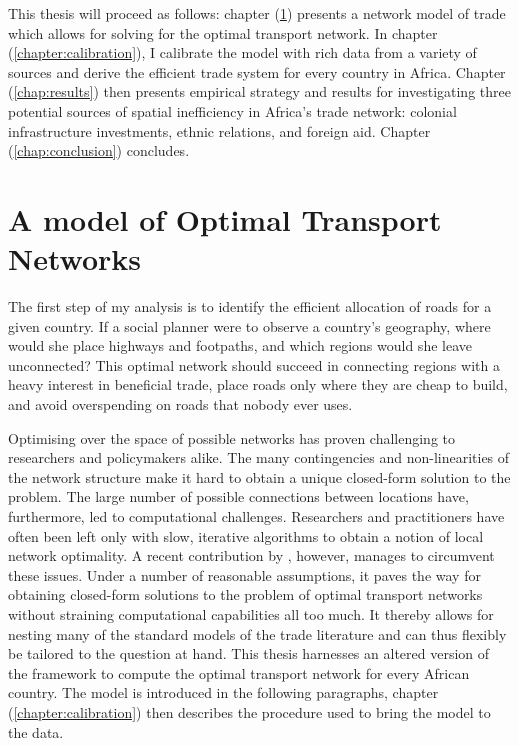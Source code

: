 \documentclass[11pt, oneside]{article}   	%
\let\oldref\ref
\renewcommand{\ref}[1]{(\oldref{#1})}
\begin{document}
This thesis will proceed as follows: chapter \ref{chap:model} presents a network model of trade which allows for solving for the optimal transport network. In chapter \ref{chapter:calibration}, I calibrate the model with rich data from a variety of sources and derive the efficient trade system for every country in Africa. Chapter \ref{chap:results} then presents empirical strategy and results for investigating three potential sources of spatial inefficiency in Africa's trade network: colonial infrastructure investments, ethnic relations, and foreign aid. Chapter \ref{chap:conclusion} concludes.

\section{A model of Optimal Transport Networks}
\label{chap:model}
The first step of my analysis is to identify the efficient allocation of roads for a given country. If a social planner were to observe a country's geography, where would she place highways and footpaths, and which regions would she leave unconnected? This optimal network should succeed in connecting regions with a heavy interest in beneficial trade, place roads only where they are cheap to build, and avoid overspending on roads that nobody ever uses.

Optimising over the space of possible networks has proven challenging to researchers and policymakers alike. The many contingencies and non-linearities of the network structure make it hard to obtain a unique closed-form solution to the problem. The large number of possible connections between locations have, furthermore, led to computational challenges. Researchers and practitioners have often been left only with slow, iterative algorithms to obtain a notion of local network optimality. A recent contribution by \cite{fajgelbaum_optimal_2017}, however, manages to circumvent these issues. Under a number of reasonable assumptions, it paves the way for obtaining closed-form solutions to the problem of optimal transport networks without straining computational capabilities all too much. It thereby allows for nesting many of the standard models of the trade literature and can thus flexibly be tailored to the question at hand. This thesis harnesses an altered version of the \citeauthor{fajgelbaum_optimal_2017} framework to compute the optimal transport network for every African country. The model is introduced in the following paragraphs, chapter \ref{chapter:calibration} then describes the procedure used to bring the model to the data.
\end{document}
